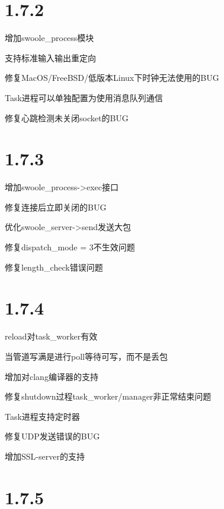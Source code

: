 \section{1.7.2}

\begin{compactitem}
\item 增加swoole\_process模块
\item 支持标准输入输出重定向
\item 修复MacOS/FreeBSD/低版本Linux下时钟无法使用的BUG
\item Task进程可以单独配置为使用消息队列通信
\item 修复心跳检测未关闭socket的BUG
\end{compactitem}

\section{1.7.3}


\begin{compactitem}
\item 增加swoole\_process->exec接口
\item 修复连接后立即关闭的BUG
\item 优化swoole\_server->send发送大包
\item 修复dispatch\_mode = 3不生效问题
\item 修复length\_check错误问题
\end{compactitem}

\section{1.7.4}

\begin{compactitem}
\item reload对task\_worker有效
\item 当管道写满是进行poll等待可写，而不是丢包
\item 增加对clang编译器的支持
\item 修复shutdown过程task\_worker/manager非正常结束问题
\item Task进程支持定时器
\item 修复UDP发送错误的BUG
\item 增加SSL-server的支持
\end{compactitem}

\section{1.7.5}


